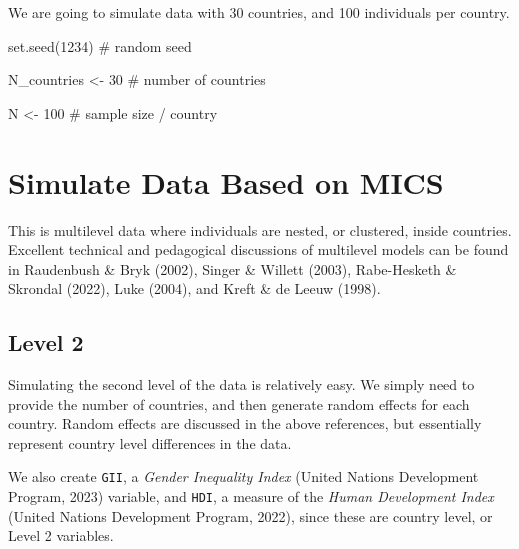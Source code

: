 \documentclass[
  letterpaper,
  DIV=11,
  numbers=noendperiod]{scrreprt}
\newenvironment{Shaded}{\begin{snugshade}}{\end{snugshade}}
\newcommand{\CommentTok}[1]{\textcolor[rgb]{0.37,0.37,0.37}{#1}}
\newcommand{\DecValTok}[1]{\textcolor[rgb]{0.68,0.00,0.00}{#1}}
\newcommand{\FunctionTok}[1]{\textcolor[rgb]{0.28,0.35,0.67}{#1}}
\newcommand{\NormalTok}[1]{\textcolor[rgb]{0.00,0.23,0.31}{#1}}
\newcommand{\OtherTok}[1]{\textcolor[rgb]{0.00,0.23,0.31}{#1}}
\begin{document}
We are going to simulate data with 30 countries, and 100 individuals per
country.

\begin{Shaded}
\begin{Highlighting}[]
\FunctionTok{set.seed}\NormalTok{(}\DecValTok{1234}\NormalTok{) }\CommentTok{\# random seed}

\NormalTok{N\_countries }\OtherTok{\textless{}{-}} \DecValTok{30} \CommentTok{\# number of countries}

\NormalTok{N }\OtherTok{\textless{}{-}} \DecValTok{100} \CommentTok{\# sample size / country}
\end{Highlighting}
\end{Shaded}

\hypertarget{simulate-data-based-on-mics}{%
\section{Simulate Data Based on
MICS}\label{simulate-data-based-on-mics}}

This is multilevel data where individuals are nested, or clustered,
inside countries. Excellent technical and pedagogical discussions of
multilevel models can be found in Raudenbush \& Bryk (2002), Singer \&
Willett (2003), Rabe-Hesketh \& Skrondal (2022), Luke (2004), and Kreft
\& de Leeuw (1998).

\hypertarget{level-2}{%
\subsection{Level 2}\label{level-2}}

Simulating the second level of the data is relatively easy. We simply
need to provide the number of countries, and then generate random
effects for each country. Random effects are discussed in the above
references, but essentially represent country level differences in the
data.

We also create \texttt{GII}, a \emph{Gender Inequality Index} (United
Nations Development Program, 2023) variable, and \texttt{HDI}, a measure
of the \emph{Human Development Index} (United Nations Development
Program, 2022), since these are country level, or Level 2 variables.
\end{document}
